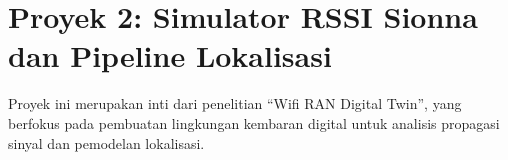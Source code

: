 

\section{Proyek 2: Simulator RSSI Sionna dan Pipeline Lokalisasi}
Proyek ini merupakan inti dari penelitian ``Wifi RAN Digital Twin'', yang berfokus pada pembuatan lingkungan kembaran digital untuk analisis propagasi sinyal dan pemodelan lokalisasi.

